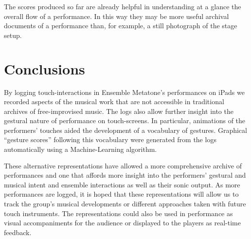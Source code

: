 \documentclass{chi-ext}
\begin{document}
The scores produced so far are already helpful in understanding at a
glance the overall flow of a performance. In this way they may be more
useful archival documents of a performance than, for example, a still
photograph of the stage setup.

\section{Conclusions}

By logging touch-interactions in Ensemble Metatone's performances on
iPads we recorded aspects of the musical work that are not accessible
in traditional archives of free-improvised music. The logs also allow
further insight into the gestural nature of performance on
touch-screens. In particular, animations of the performers' touches
aided the development of a vocabulary of gestures.  Graphical
``gesture scores'' following this vocabulary were generated from
the logs automatically using a Machine-Learning algorithm. 

These alternative representations have allowed a more comprehensive archive
of performances and one that affords more insight into the performers'
gestural and musical intent and ensemble interactions as well as
their sonic output. As more performances are logged, it is hoped that
these representations will allow us to track the group's musical
developments or different approaches taken with future touch
instruments. The representations could also be used in performance as
visual accompaniments for the audience or displayed to the players as
real-time feedback.

\balance


\end{document}
